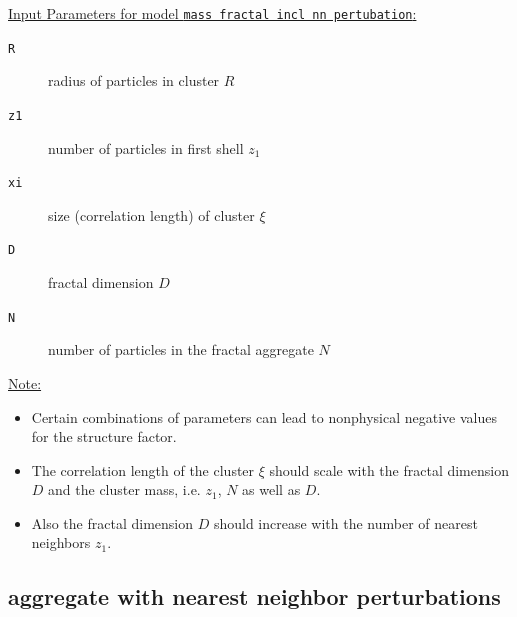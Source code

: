 \noindent \uline{Input Parameters for model \texttt{mass fractal incl nn pertubation}:}
\begin{description}
\item[\texttt{R}] radius of particles in cluster $R$
\item[\texttt{z1}] number of particles in first shell $z_1$
\item[\texttt{xi}] size (correlation length) of cluster $\xi$
\item[\texttt{D}] fractal dimension $D$
\item[\texttt{N}] number of particles in the fractal aggregate $N$
\end{description}

\noindent\uline{Note:}
\begin{itemize}
\item Certain combinations of parameters can lead to nonphysical negative values for the structure factor.
\item The correlation length of the cluster $\xi$ should scale with the fractal dimension $D$ and the cluster mass, i.e. $z_1$, $N$ as well as $D$.
\item Also the fractal dimension $D$ should increase with the number of nearest neighbors $z_1$.
\end{itemize}

\subsection{aggregate with nearest neighbor perturbations}~\\

